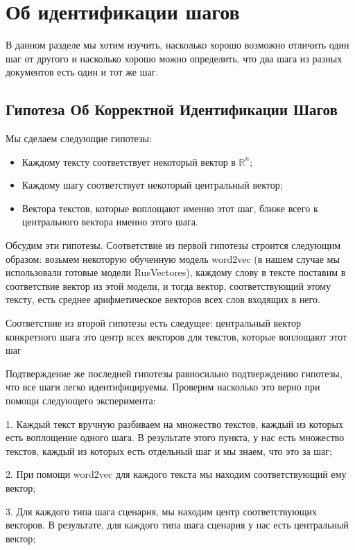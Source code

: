 \documentclass[12pt]{article}
\begin{document}
\section{Об идентификации шагов}

В данном разделе мы хотим изучить, насколько хорошо возможно отличить один шаг от другого и насколько хорошо можно определить, что два шага из разных документов есть один и тот же шаг. 

\subsection{Гипотеза Об Корректной Идентификации Шагов}

Мы сделаем следующие гипотезы:
\begin{itemize}
	\item Каждому тексту соответствует некоторый вектор в $\mathbb{R}^n$;
	\item Каждому шагу соответствует некоторый центральный вектор;
	\item Вектора текстов, которые воплощают именно этот шаг, ближе всего к центрального вектора именно этого шага.

\end{itemize}

Обсудим эти гипотезы. Соответствие из первой гипотезы строится следующим образом: возьмем некоторую обученную модель word2vec (в нашем случае мы использовали готовые модели RusVectores), каждому слову в тексте поставим в соответствие вектор из этой модели, и тогда вектор, соответствующий этому тексту, есть среднее арифметическое векторов всех слов входящих в него.

Соответствие из второй гипотезы есть следущее: центральный вектор конкретного шага это центр всех векторов для текстов, которые воплощают этот шаг

Подтверждение же последней гипотезы равносильно подтверждению гипотезы, что все шаги легко идентифицируемы. Проверим насколько это верно при помощи следующего эксперимента:

1. Каждый текст вручную разбиваем на множество текстов, каждый из которых есть воплощение одного шага. В результате этого пункта, у нас есть множество текстов, каждый из которых есть отдельный шаг и мы знаем, что это за шаг;

2. При помощи word2vec для каждого текста мы находим соответствующий ему вектор;

3.  Для каждого типа шага сценария, мы находим центр соответствующих векторов. В результате, для каждого типа шага сценария у нас есть центральный вектор;
\end{document}
